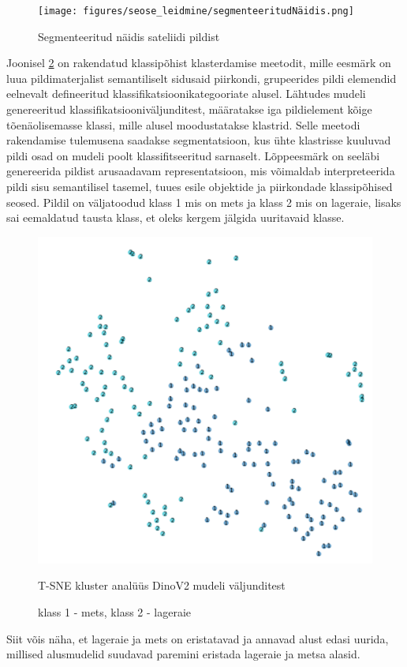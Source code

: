 \begin{figure}[H]
    \centering
    \texttt{[image: figures/seose\_leidmine/segmenteeritudNäidis.png]}
    \caption{Segmenteeritud näidis sateliidi pildist}
    \label{fig:segmenteeritudPealiskiht}
\end{figure}

Joonisel \ref{fig:tsneDinoPatchEmbedings} on rakendatud klassipõhist klasterdamise meetodit, mille eesmärk on luua
pildimaterjalist semantiliselt sidusaid piirkondi, grupeerides pildi elemendid
eelnevalt defineeritud klassifikatsioonikategooriate alusel. Lähtudes mudeli
genereeritud klassifikatsiooniväljunditest, määratakse iga pildielement kõige
tõenäolisemasse klassi, mille alusel moodustatakse klastrid. Selle meetodi
rakendamise tulemusena saadakse segmentatsioon, kus ühte klastrisse kuuluvad
pildi osad on mudeli poolt klassifitseeritud sarnaselt. Lõppeesmärk on seeläbi
genereerida pildist arusaadavam representatsioon, mis
võimaldab interpreteerida pildi sisu semantilisel tasemel, tuues
esile objektide ja piirkondade klassipõhised seosed. Pildil on väljatoodud klass 1 mis on mets ja klass 2 mis on lageraie, lisaks sai eemaldatud tausta klass, et oleks kergem jälgida uuritavaid klasse.

\begin{figure}[H]
    \centering
    \includegraphics[width=.7\textwidth]{figures/seose_leidmine/tsneDinoPatchEmbedings.png}
    \caption{T-SNE kluster analüüs DinoV2 mudeli väljunditest}
    \caption*{klass 1 - mets, klass 2 - lageraie}
    \label{fig:tsneDinoPatchEmbedings}
\end{figure}

Siit võis näha, et lageraie ja mets on eristatavad ja annavad alust edasi uurida, millised alusmudelid suudavad paremini eristada lageraie ja metsa alasid.
